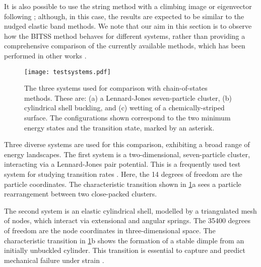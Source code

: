 \documentclass[aip,jcp,reprint,twocolumn]{revtex4-1}
\begin{document}
It is also possible to use the string method with a climbing image \cite{E2007} or eigenvector following \cite{Zimmerman2013}; although, in this case, the results are expected to be similar to the nudged elastic band methods.
We note that our aim in this section is to observe how the BITSS method behaves for different systems, rather than providing a comprehensive comparison of the currently available methods, which has been performed in other works \cite{Koslover2007,Sheppard2008}.

\begin{figure}[tb]
  \texttt{[image: testsystems.pdf]}
  \caption{\label{fig:testsystems}
    The three systems used for comparison with chain-of-states methods.
    These are: (a) a Lennard-Jones seven-particle cluster, (b) cylindrical shell buckling, and (c) wetting of a chemically-striped surface.
    The configurations shown correspond to the two minimum energy states and the transition state, marked by an asterisk.
  }
\end{figure}

Three diverse systems are used for this comparison, exhibiting a broad range of energy landscapes.
The first system is a two-dimensional, seven-particle cluster, interacting via a Lennard-Jones pair potential.
This is a frequently used test system for studying transition rates \cite{Wales2002,Passerone2001}.
Here, the 14 degrees of freedom are the particle coordinates.
The characteristic transition shown in \cref{fig:testsystems}a sees a particle rearrangement between two close-packed clusters.

The second system is an elastic cylindrical shell, modelled by a triangulated mesh of nodes, which interact via extensional and angular springs.
The \num{35400} degrees of freedom are the node coordinates in three-dimensional space.
The characteristic transition in \cref{fig:testsystems}b shows the formation of a stable dimple from an initially unbuckled cylinder.
This transition is essential to capture and predict mechanical failure under strain \cite{Panter2019,Virot2017}.
\end{document}
